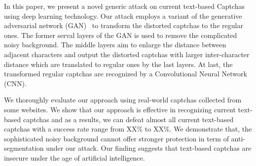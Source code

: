 In this paper, we present a novel generic attack on current text-based Captchas using deep learning technology. Our attack employs a variant of the generative adversarial network (GAN)~\cite{pix2pix2016} to transform the distorted captchas to the regular ones. The former serval layers of the GAN is used to remove the complicated noisy background. The middle layers aim to enlarge the distance between adjacent characters and output the distorted captchas with larger inter-character distance which are translated to regular ones by the last layers. At last, the transformed regular captchas are recognized by a Convolutional Neural Network (CNN).

We thoroughly evaluate our approach using real-world captchas collected from some websites. We show that our approach is effective in recognizing current text-based captchas and as a results, we can defeat almost all current text-based captchas with a success rate range from XX\% to XX\%. We demonstrate that, the sophisticated noisy background cannot offer stronger protection in term of anti-segmentation under our attack. Our finding suggests that text-based captchas are insecure under the age of artificial intelligence.

